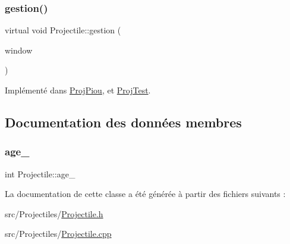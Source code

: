 \mbox{\label{class_projectile_aa969857f9837d9be3a6ea415c9ba3ff1}} 
\subsubsection{\texorpdfstring{gestion()}{gestion()}}
{\footnotesize\ttfamily virtual void Projectile\+::gestion (\begin{DoxyParamCaption}\item[{sf\+::\+Render\+Window \&}]{window }\end{DoxyParamCaption})\hspace{0.3cm}{\ttfamily [pure virtual]}}



Implémenté dans \hyperlink{class_proj_piou_a01b45e4045391883472e283e027cf7de}{Proj\+Piou}, et \hyperlink{class_proj_test_a6649e6591e463315aa9513854e2515d4}{Proj\+Test}.



\subsection{Documentation des données membres}
\mbox{\label{class_projectile_a1f0a231e002d4796c32ccfeb36c887b1}} 
\subsubsection{\texorpdfstring{age\+\_\+}{age\_}}
{\footnotesize\ttfamily int Projectile\+::age\+\_\+\hspace{0.3cm}{\ttfamily [protected]}}



La documentation de cette classe a été générée à partir des fichiers suivants \+:\begin{DoxyCompactItemize}
\item 
src/\+Projectiles/\hyperlink{_projectile_8h}{Projectile.\+h}\item 
src/\+Projectiles/\hyperlink{_projectile_8cpp}{Projectile.\+cpp}\end{DoxyCompactItemize}
